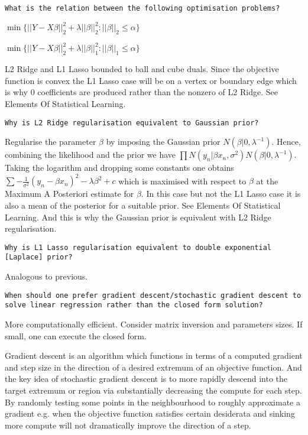 \texttt{What is the relation between the following optimisation problems?}

$\min \{ ||Y - X \beta||_2^2 + \lambda ||\beta||_2^2 : ||\beta||_2 \le \alpha \}$

$\min \{ ||Y - X \beta||_2^2 + \lambda ||\beta||_1^2 : ||\beta||_1 \le \alpha \}$

L2 Ridge and L1 Lasso bounded to ball and cube duals. Since the objective function is convex the L1 Lasso case will be on a vertex or boundary edge which is why $0$ coefficients are produced rather than the nonzero of L2 Ridge. See Elements Of Statistical Learning.

\texttt{Why is L2 Ridge regularisation equivalent to Gaussian prior?}

Regularise the parameter $\beta$ by imposing the Gaussian prior $N(\beta | 0,\lambda^{-1})$. Hence, combining the likelihood and the prior we have $\prod N(y_n | \beta x_n,\sigma^2)N(\beta | 0,\lambda^{-1})$. Taking the logarithm and dropping some constants one obtains $\sum -\frac{1}{\sigma^2} (y_n - \beta x_n)^2 - \lambda \beta^2 + c$ which is maximised with respect to $\beta$ at the Maximum A Posteriori estimate for $\beta$. In this case but not the L1 Lasso case it is also a mean of the posterior for a suitable prior. See Elements Of Statistical Learning. And this is why the Gaussian prior is equivalent with L2 Ridge regularisation.

\texttt{Why is L1 Lasso regularisation equivalent to double exponential [Laplace] prior?}

Analogous to previous.

\texttt{When should one prefer gradient descent/stochastic gradient descent to solve linear regression rather than the closed form solution?}

More computationally efficient. Consider matrix inversion and parameters sizes. If small, one can execute the closed form.

Gradient descent is an algorithm which functions in terms of a computed gradient and step size in the direction of a desired extremum of an objective function. And the key idea of stochastic gradient descent is to more rapidly descend into the target extremum or region via substantially decreasing the compute for each step. By randomly testing some points in the neighbourhood to roughly approximate a gradient e.g. when the objective function satisfies certain desiderata and sinking more compute will not dramatically improve the direction of a step.


